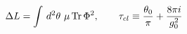 \begin{equation} 
\Delta { L}=   \int \, d^2 \theta \, \,   \mu  \,  {\hbox {\rm Tr}}   \, \Phi^2, \qquad    
 \tau_{cl} \equiv  {\theta_0 \over \pi} + {8 \pi i \over  g_0^2} \end{equation} 
